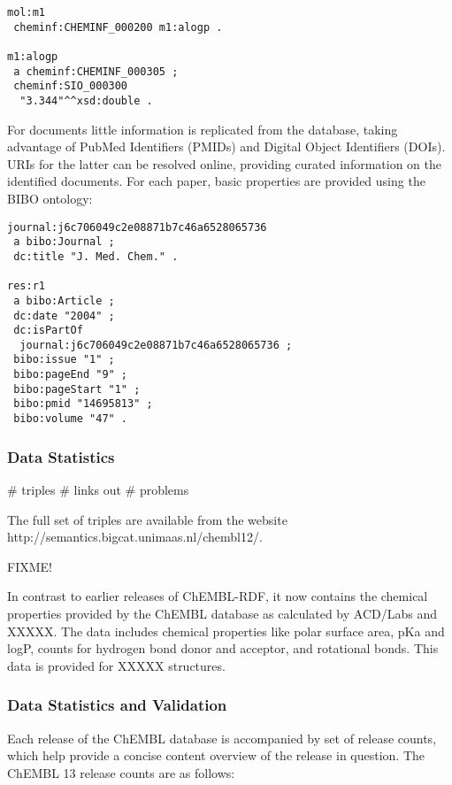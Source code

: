 \documentclass[sw]{iosart2c}
\begin{document}
\begin{footnotesize}
\begin{verbatim}
mol:m1
 cheminf:CHEMINF_000200 m1:alogp .

m1:alogp
 a cheminf:CHEMINF_000305 ;
 cheminf:SIO_000300
  "3.344"^^xsd:double .
\end{verbatim}
\end{footnotesize}

For documents little information is replicated from the database, taking advantage
of PubMed Identifiers (PMIDs) and Digital Object Identifiers (DOIs). URIs for the
latter can be resolved online, providing curated information on the identified
documents. For each paper, basic properties are provided using the BIBO
ontology:

\begin{footnotesize}
\begin{verbatim}
journal:j6c706049c2e08871b7c46a6528065736
 a bibo:Journal ;
 dc:title "J. Med. Chem." .

res:r1
 a bibo:Article ;
 dc:date "2004" ;
 dc:isPartOf
  journal:j6c706049c2e08871b7c46a6528065736 ;
 bibo:issue "1" ;
 bibo:pageEnd "9" ;
 bibo:pageStart "1" ;
 bibo:pmid "14695813" ;
 bibo:volume "47" .
\end{verbatim}
\end{footnotesize}

\subsubsection{Data Statistics}

\# triples
\# links out
\# problems

The full set of triples are available from the website http://semantics.bigcat.unimaas.nl/chembl12/.

FIXME!

In contrast to earlier releases of ChEMBL-RDF, it now contains the chemical properties
provided by the ChEMBL database as calculated by ACD/Labs and XXXXX. The data includes
chemical properties like polar surface area, pKa and logP, counts for hydrogen bond donor
and acceptor, and rotational bonds. This data is provided for XXXXX structures.

\subsubsection{Data Statistics and Validation}

Each release of the ChEMBL database is accompanied by set of release counts, which help 
provide a concise content overview of the release in question. The ChEMBL 13 release counts
are as follows:
\end{document}
